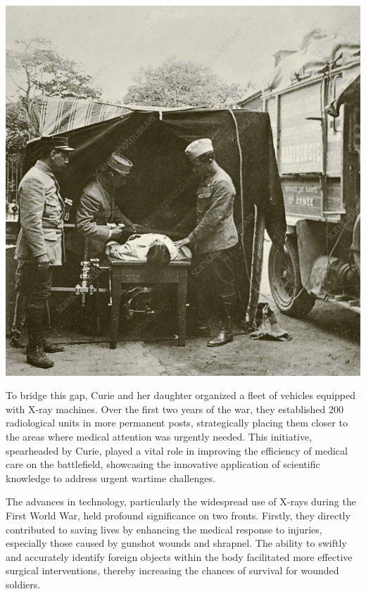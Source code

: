 \documentclass[a4paper,12pt]{report}
\begin{document}
\begin{center}
  \includegraphics[scale =0.5]{mobileUnit.png}
  \label{mobileUnit}
\end{center}

To bridge this gap, Curie and her daughter organized a fleet of vehicles equipped with X-ray
machines. Over the first two years of the war, they established 200 radiological units in more
permanent posts, strategically placing them closer to the areas where medical attention was
urgently needed. This initiative, spearheaded by Curie, played a vital role in improving the
efficiency of medical care on the battlefield, showcasing the innovative application of scientific
knowledge to address urgent wartime challenges.

The advances in technology, particularly the widespread use of X-rays during the First World
War, held profound significance on two fronts. Firstly, they directly contributed to saving lives
by enhancing the medical response to injuries, especially those caused by gunshot wounds and
shrapnel. The ability to swiftly and accurately identify foreign objects within the body facilitated
more effective surgical interventions, thereby increasing the chances of survival for wounded
soldiers.
\end{document}
